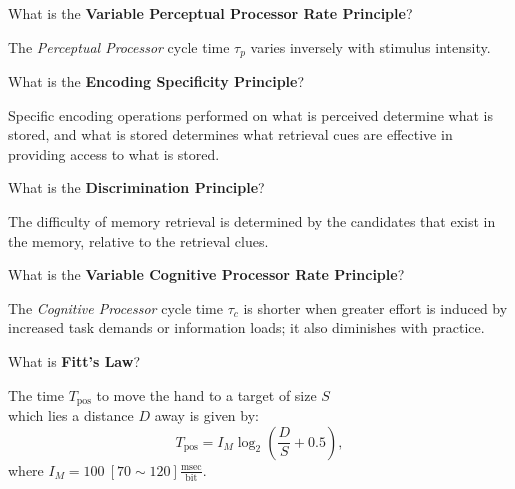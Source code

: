 \begin{flashcard}[Question]{What is the \textbf{Variable Perceptual Processor Rate Principle}?}
\begin{center}
The \textit{Perceptual Processor} cycle time $\tau_p$ varies inversely with stimulus intensity.
\end{center}
\end{flashcard}

\begin{flashcard}[Question]{What is the \textbf{Encoding Specificity Principle}?}
\begin{center}
Specific encoding operations performed on what is perceived determine what is stored, and what is stored determines what retrieval cues are effective in providing access to what is stored.
\end{center}
\end{flashcard}

\begin{flashcard}[Question]{What is the \textbf{Discrimination Principle}?}
\begin{center}
The difficulty of memory retrieval is determined by the candidates that exist in the memory, relative to the retrieval clues.
\end{center}
\end{flashcard}

\begin{flashcard}[Question]{What is the \textbf{Variable Cognitive Processor Rate Principle}?}
\begin{center}
The \textit{Cognitive Processor} cycle time $\tau_c$ is shorter when greater effort is induced by increased task demands or information loads; it also diminishes with practice.
\end{center}
\end{flashcard}

\begin{flashcard}[Question]{What is \textbf{Fitt's Law}?}
\begin{center}
The time $T_{\text{pos}}$ to move the hand to a target of size $S$\\which lies a distance $D$ away is given by:
\begin{displaymath}
T_{\text{pos}} = I_M \log_2 (\frac{D}{S} + 0.5),
\end{displaymath}
where $I_M = 100~[70 \sim 120] \frac{\text{msec}}{\text{bit}}$.
\end{center}
\end{flashcard}

